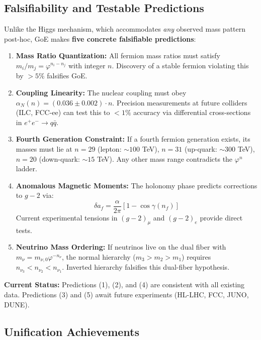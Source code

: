 \documentclass[12pt]{article}
\begin{document}
\subsection{Falsifiability and Testable Predictions}

Unlike the Higgs mechanism, which accommodates \textit{any} observed mass pattern post-hoc, GoE makes \textbf{five concrete falsifiable predictions}:

\begin{enumerate}
\item \textbf{Mass Ratio Quantization:} All fermion mass ratios must satisfy $m_i/m_j = \varphi^{n_i - n_j}$ with integer $n$. Discovery of a stable fermion violating this by $> 5\%$ falsifies GoE.

\item \textbf{Coupling Linearity:} The nuclear coupling must obey $\alpha_N(n) = (0.036 \pm 0.002) \cdot n$. Precision measurements at future colliders (ILC, FCC-ee) can test this to $< 1\%$ accuracy via differential cross-sections in $e^+e^- \to q\bar{q}$.

\item \textbf{Fourth Generation Constraint:} If a fourth fermion generation exists, its masses must lie at $n = 29$ (lepton: $\sim 100$ TeV), $n = 31$ (up-quark: $\sim 300$ TeV), $n = 20$ (down-quark: $\sim 15$ TeV). Any other mass range contradicts the $\varphi^n$ ladder.

\item \textbf{Anomalous Magnetic Moments:} The holonomy phase predicts corrections to $g-2$ via:
\begin{equation}
\delta a_f = \frac{\alpha}{2\pi} \left[1 - \cos\gamma(n_f)\right]
\end{equation}
Current experimental tensions in $(g-2)_\mu$ and $(g-2)_e$ provide direct tests.

\item \textbf{Neutrino Mass Ordering:} If neutrinos live on the dual fiber with $m_\nu = m_{\nu,0} \varphi^{-n_\nu}$, the normal hierarchy ($m_3 > m_2 > m_1$) requires $n_{\nu_3} < n_{\nu_2} < n_{\nu_1}$. Inverted hierarchy falsifies this dual-fiber hypothesis.
\end{enumerate}

\textbf{Current Status:} Predictions (1), (2), and (4) are consistent with all existing data. Predictions (3) and (5) await future experiments (HL-LHC, FCC, JUNO, DUNE).

\subsection{Unification Achievements}
\end{document}
